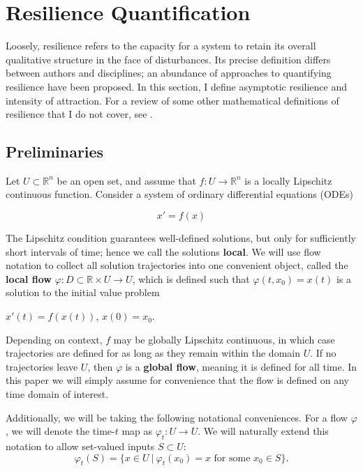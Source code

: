 \section{Resilience Quantification}
\label{sec:resilience}

Loosely, resilience refers to the capacity for a system to retain its overall qualitative structure in the face of disturbances. Its precise definition differs between authors and disciplines; an abundance of approaches to quantifying resilience have been proposed. 
%
In this section, I define asymptotic resilience and intensity of attraction. 
%
For a review of some other mathematical definitions of resilience that I do not cover, see \cite{meyerMathematicalReviewResilience2016}.


\subsection{Preliminaries}
Let $U \subset \mathbb{R}^n$ be an open set, and assume that $f : U \to \mathbb{R}^n$ is a locally Lipschitz continuous function. Consider a system of ordinary differential equations (ODEs) 

\begin{equation}
	\label{eqn:ode}
	x' = f(x)
\end{equation}

The Lipschitz condition guarantees well-defined solutions, but only for sufficiently short intervals of time; hence we call the solutions \textbf{local}. We will use flow notation to collect all solution trajectories into one convenient object, called the \textbf{local flow} $\varphi: D \subset \mathbb{R} \times U \to U$, which is defined such that $\varphi(t,x_0) = x(t)$ is a solution to the initial value problem \begin{center}
	$x'(t) = f(x(t))$, \hspace{0.25in} $x(0) = x_0$. 
\end{center}

Depending on context, $f$ may be globally Lipschitz continuous, in which case trajectories are defined for as long as they remain within the domain $U$. If no trajectories leave $U$, then $\varphi$ is a \textbf{global flow}, meaning it is defined for all time. In this paper we will simply assume for convenience that the flow is defined on any time domain of interest. 

Additionally, we will be taking the following notational conveniences. For a flow $\varphi$, we will denote the time-$t$ map as $\varphi_t: U \to U$. We will naturally extend this notation to allow set-valued inputs $S\subset U$: $$\varphi_t(S) = \{x\in U ~| ~\varphi_t(x_0) = x \text{ for some } x_0 \in S\}.$$

